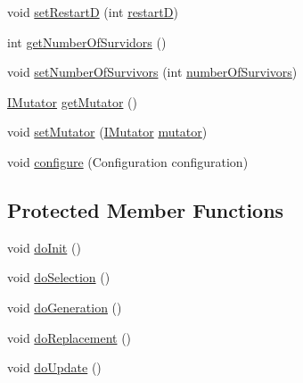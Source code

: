 \begin{DoxyCompactItemize}
\item 
void \hyperlink{classnet_1_1sf_1_1jclec_1_1algorithm_1_1classic_1_1_c_h_c_a016cf9538a31a771aa2c1b3f026cd4af}{set\-Restart\-D} (int \hyperlink{classnet_1_1sf_1_1jclec_1_1algorithm_1_1classic_1_1_c_h_c_a6cd78db6a675d92c105ee5e4cf5abe68}{restart\-D})
\item 
int \hyperlink{classnet_1_1sf_1_1jclec_1_1algorithm_1_1classic_1_1_c_h_c_a7c43670824769e5a587a553651139ae2}{get\-Number\-Of\-Survidors} ()
\item 
void \hyperlink{classnet_1_1sf_1_1jclec_1_1algorithm_1_1classic_1_1_c_h_c_adda9d489762695605817a0cb70773db4}{set\-Number\-Of\-Survivors} (int \hyperlink{classnet_1_1sf_1_1jclec_1_1algorithm_1_1classic_1_1_c_h_c_a1b2005c9606fa0bd250efda96aa078d9}{number\-Of\-Survivors})
\item 
\hyperlink{interfacenet_1_1sf_1_1jclec_1_1_i_mutator}{I\-Mutator} \hyperlink{classnet_1_1sf_1_1jclec_1_1algorithm_1_1classic_1_1_c_h_c_aa238175b12ebb189aafe64e9ccb5f0db}{get\-Mutator} ()
\item 
void \hyperlink{classnet_1_1sf_1_1jclec_1_1algorithm_1_1classic_1_1_c_h_c_ab29cf3fb56310cdbef735eed330d03c6}{set\-Mutator} (\hyperlink{interfacenet_1_1sf_1_1jclec_1_1_i_mutator}{I\-Mutator} \hyperlink{classnet_1_1sf_1_1jclec_1_1algorithm_1_1classic_1_1_c_h_c_adfd26c19f5be720ec4dc4199b99cdf96}{mutator})
\item 
void \hyperlink{classnet_1_1sf_1_1jclec_1_1algorithm_1_1classic_1_1_c_h_c_aa7f07c25bf43054348667de877ba4b2e}{configure} (Configuration configuration)
\end{DoxyCompactItemize}
\subsection*{Protected Member Functions}
\begin{DoxyCompactItemize}
\item 
void \hyperlink{classnet_1_1sf_1_1jclec_1_1algorithm_1_1classic_1_1_c_h_c_aa707ae364027caf08eba0499fc310efe}{do\-Init} ()
\item 
void \hyperlink{classnet_1_1sf_1_1jclec_1_1algorithm_1_1classic_1_1_c_h_c_a8e0ae8b8e6537421347a28eb8c8bc039}{do\-Selection} ()
\item 
void \hyperlink{classnet_1_1sf_1_1jclec_1_1algorithm_1_1classic_1_1_c_h_c_ac5e50e91baa147c263dd73e039aa10e1}{do\-Generation} ()
\item 
void \hyperlink{classnet_1_1sf_1_1jclec_1_1algorithm_1_1classic_1_1_c_h_c_a4ccfdb444710b853f4a8dfeed86e7b8b}{do\-Replacement} ()
\item 
void \hyperlink{classnet_1_1sf_1_1jclec_1_1algorithm_1_1classic_1_1_c_h_c_a3e4179196cc7577862038e2355471d04}{do\-Update} ()
\end{DoxyCompactItemize}
